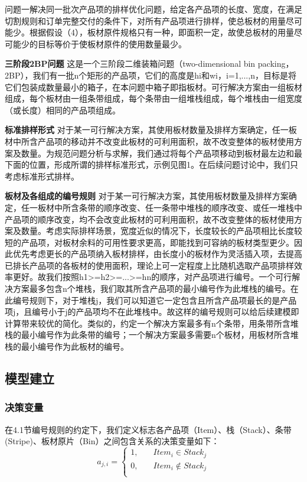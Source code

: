 \documentclass[bwprint]{gmcmthesis}
\begin{document}
问题一解决同一批次产品项的排样优化问题，给定各产品项的长度、宽度，在满足切割规则和订单完整交付的条件下，对所有产品项进行排样，使总板材的用量尽可能少。根据假设（4），板材原件规格只有一种，即面积一定，故使总板材的用量尽可能少的目标等价于使板材原件的使用数量最少。

\textbf{三阶段2BP问题} \quad 这是一个三阶段二维装箱问题（two-dimensional bin packing，2BP），我们有一批n个矩形的产品项，它们的高度是hi和wi，i=1,...,n，目标是将它们包装成数量最小的箱子，在本问题中箱子即指板材。可行解决方案由一组板材组成，每个板材由一组条带组成，每个条带由一组堆栈组成，每个堆栈由一组宽度（或长度）相同的产品项组成。

\textbf{标准排样形式} \quad 对于某一可行解决方案，其使用板材数量及排样方案确定，任一板材中所含产品项的移动并不改变此板材的可利用面积，故不改变整体的板材使用方案及数量。为规范问题分析与求解，我们通过将每个产品项移动到板材最左边和最下面的位置，形成所谓的排样标准形式，示例见图1。在后续问题讨论中，我们只考虑标准形式排样。

\textbf{板材及各组成的编号规则} \quad 对于某一可行解决方案，其使用板材数量及排样方案确定，任一板材中所含条带的顺序改变、任一条带中堆栈的顺序改变、或任一堆栈中产品项的顺序改变，均不会改变此板材的可利用面积，故不改变整体的板材使用方案及数量。考虑实际排样场景，宽度近似的情况下，长度较长的产品项相比长度较短的产品项，对板材余料的可用性要求更高，即能找到可容纳的板材类型更少。因此优先考虑更长的产品项纳入板材排样，由长度小的板材作为灵活插入项，去提高已排长产品项的各板材的使用面积，理论上可一定程度上比随机选取产品项排样效率更好。故我们按照h1>=h2>=...>=hn的顺序，对产品项进行编号。一个可行解决方案最多包含n个堆栈，我们取其所含产品项的最小编号作为此堆栈的编号。在此编号规则下，对于堆栈j，我们可以知道它一定包含且所含产品项最长的是产品项j，且编号小于j的产品项均不在此堆栈中。故这样的编号规则可以给后续建模即计算带来较优的简化。类似的，约定一个解决方案最多有n个条带，用条带所含堆栈的最小编号作为此条带的编号；一个解决方案最多需要n个板材，用板材所含堆栈的最小编号作为此板材的编号。


\subsection{模型建立}

\subsubsection{决策变量}
在4.1节编号规则的约定下，我们定义标志各产品项（Item）、栈（Stack）、条带(Stripe)、板材原片（Bin）之间包含关系的决策变量如下：
\begin{equation}   %
    a_{j,i}=
    \begin{cases}
        1, \quad  & Item_i \in  Stack_j \\
        0,\quad  & Item_i  \notin  Stack_j \\
    \end{cases}
\end{equation}
\end{document}
